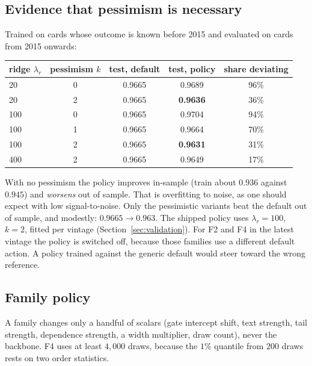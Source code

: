 \subsection{Evidence that pessimism is necessary}

Trained on cards whose outcome is known before 2015 and evaluated on cards from 2015 onwards:
\begin{center}
\begin{tabular}{lcccc}
\toprule
ridge $\lambda_r$ & pessimism $k$ & test, default & test, policy & share deviating\\
\midrule
20 & 0 & 0.9665 & 0.9689 & 96\%\\
20 & 2 & 0.9665 & \textbf{0.9636} & 36\%\\
100 & 0 & 0.9665 & 0.9704 & 94\%\\
100 & 1 & 0.9665 & 0.9664 & 70\%\\
100 & 2 & 0.9665 & \textbf{0.9631} & 31\%\\
400 & 2 & 0.9665 & 0.9649 & 17\%\\
\bottomrule
\end{tabular}
\end{center}
With no pessimism the policy improves in-sample (train about $0.936$ against $0.945$) and \emph{worsens} out of sample. That is overfitting to noise, as
one should expect with low signal-to-noise. Only the pessimistic variants beat the default out of sample, and modestly: $0.9665\to0.963$. The
shipped policy uses $\lambda_r=100$, $k=2$, fitted per vintage (Section~\ref{sec:validation}). For F2 and F4 in the latest vintage the policy is
switched off, because those families use a different default action. A policy trained against the generic default would steer toward the wrong
reference.

\subsection{Family policy}

A family changes only a handful of scalars (gate intercept shift, text strength, tail strength, dependence strength, a width multiplier, draw
count), never the backbone. F4 uses at least $4{,}000$ draws, because the $1\%$ quantile from $200$ draws rests on two order statistics.
